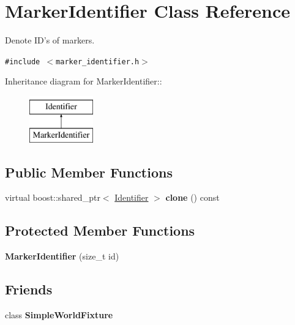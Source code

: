 \hypertarget{class_marker_identifier}{
\section{MarkerIdentifier Class Reference}
\label{class_marker_identifier}
}
Denote ID's of markers.  


{\tt \#include $<$marker\_\-identifier.h$>$}

Inheritance diagram for MarkerIdentifier::\begin{figure}[H]
\begin{center}
\leavevmode
\includegraphics[height=2cm]{class_marker_identifier}
\end{center}
\end{figure}
\subsection*{Public Member Functions}
\begin{CompactItemize}
\item 
\hypertarget{class_marker_identifier_2b872bb640d730f586898bfec6bdccd9}{
virtual boost::shared\_\-ptr$<$ \hyperlink{class_identifier}{Identifier} $>$ \textbf{clone} () const }
\label{class_marker_identifier_2b872bb640d730f586898bfec6bdccd9}

\end{CompactItemize}
\subsection*{Protected Member Functions}
\begin{CompactItemize}
\item 
\hypertarget{class_marker_identifier_25454cbe8affbdec98269f46a59a40a7}{
\textbf{MarkerIdentifier} (size\_\-t id)}
\label{class_marker_identifier_25454cbe8affbdec98269f46a59a40a7}

\end{CompactItemize}
\subsection*{Friends}
\begin{CompactItemize}
\item 
\hypertarget{class_marker_identifier_6433c824d5e64fc5b3635b2a0f2af16c}{
class \textbf{SimpleWorldFixture}}
\label{class_marker_identifier_6433c824d5e64fc5b3635b2a0f2af16c}

\end{CompactItemize}


